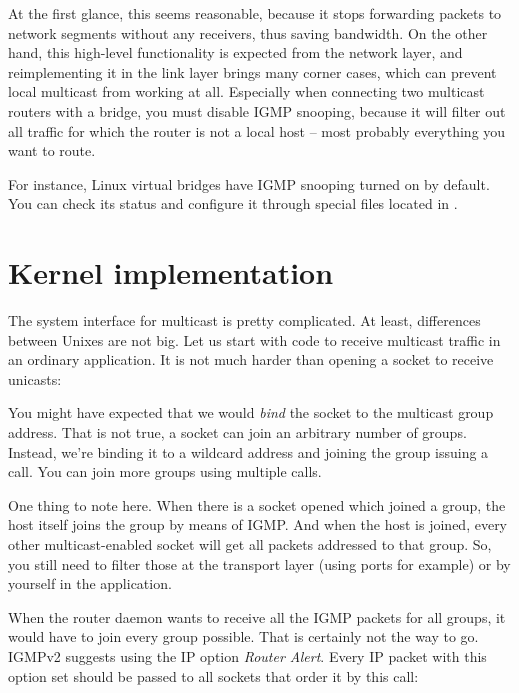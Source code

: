 At the first glance, this seems reasonable, because it stops forwarding packets
to network segments without any receivers, thus saving bandwidth. On the other
hand, this high-level functionality is expected from the network layer, and
reimplementing it in the link layer brings many corner cases, which can prevent
local multicast from working at all. Especially when connecting two multicast
routers with a bridge, you must disable IGMP snooping, because it will filter
out all traffic for which the router is not a local host -- most probably
everything you want to route.

For instance, Linux virtual bridges have IGMP snooping turned on by default.
You can check its status and configure it through special files located in
.

\def\setsockopt{\ttt{set\-sock\-opt} }
\section{Kernel implementation}

The system interface for multicast is pretty complicated. At least, differences
between Unixes are not big. Let us start with code to receive multicast traffic
in an ordinary application. It is not much harder than opening a socket to
receive unicasts:



\noindent You might have expected that we would \emph{bind} the socket to the
multicast group address. That is not true, a socket can join an arbitrary
number of groups. Instead, we're binding it to a wildcard address and joining
the group issuing a~\setsockopt call. You can join more groups using multiple calls.

One thing to note here. When there is a socket opened which joined a group, the host itself joins the group by means of IGMP. And when the host is
joined, every other multicast-enabled socket will get all packets addressed to that
group. So, you still need to filter those at the transport layer (using ports
for example) or by yourself in the application.

When the router daemon wants to receive all the IGMP packets for all groups, it
would have to join every group possible. That is certainly not the way to go.
IGMPv2 suggests using the IP option \emph{Router Alert}. Every IP packet with this option
set should be passed to all sockets that order it by this \setsockopt call:

